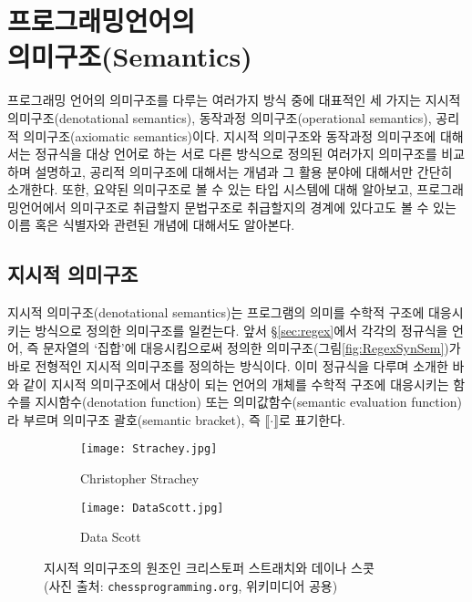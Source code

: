 \chapter[프로그래밍언어의 의미구조(Semantics)]{프로그래밍언어의\\의미구조(Semantics)}

프로그래밍 언어의 의미구조를 다루는 여러가지 방식 중에 대표적인
세 가지는 지시적 의미구조(denotational semantics),
동작과정 의미구조(operational semantics),
공리적 의미구조(axiomatic semantics)이다.
지시적 의미구조와 동작과정 의미구조에 대해서는 정규식을 대상 언어로 하는
서로 다른 방식으로 정의된 여러가지 의미구조를 비교하며 설명하고,
공리적 의미구조에 대해서는 개념과 그 활용 분야에 대해서만 간단히 소개한다.
또한, 요약된 의미구조로 볼 수 있는 타입 시스템에 대해 알아보고,
프로그래밍언어에서 의미구조로 취급할지 문법구조로 취급할지의 경계에
있다고도 볼 수 있는 이름 혹은 식별자와 관련된 개념에 대해서도 알아본다.

\newpage

\section{지시적 의미구조}
지시적 의미구조(denotational semantics)는 프로그램의 의미를 수학적 구조에
대응시키는 방식으로 정의한 의미구조를 일컫는다. 앞서 \S\ref{sec:regex}에서
각각의 정규식을 언어, 즉 문자열의 `집합'에 대응시킴으로써 정의한 
의미구조(그림\;\ref{fig:RegexSynSem})가 바로 전형적인 지시적 의미구조를
정의하는 방식이다. 이미 정규식을 다루며 소개한 바와 같이 지시적 의미구조에서
대상이 되는 언어의 개체를 수학적 구조에 대응시키는 함수를 지시함수(denotation function)
또는 의미값함수(semantic evaluation function)라 부르며 의미구조 괄호(semantic bracket),
즉 $\llbracket\cdot\rrbracket$로 표기한다.

\begin{figure}\centering
\begin{subfigure}{.3\textwidth}\centering\vspace*{-2ex}
\texttt{[image: Strachey.jpg]}
\caption{Christopher Strachey}
\end{subfigure}
\qquad\qquad
\begin{subfigure}{.3\textwidth}\centering\vspace*{-2ex}
\texttt{[image: DataScott.jpg]}
\caption{Data Scott}
\end{subfigure}
\caption{지시적 의미구조의 원조인
         크리스토퍼 스트래치와 데이나 스콧 \\
         {\footnotesize(사진 출처:
              \texttt{chessprogramming.org}, 위키미디어 공용)} }
\end{figure}

